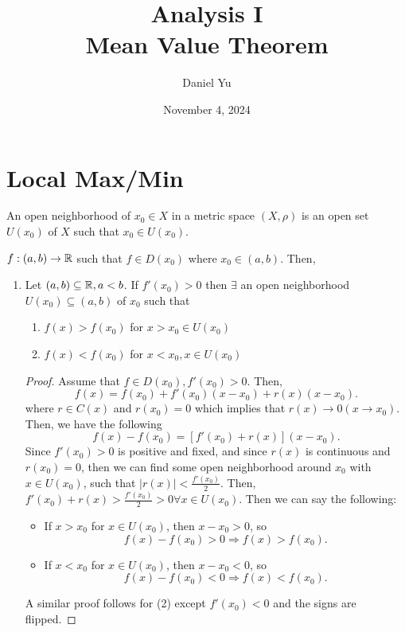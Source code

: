 \documentclass[a4paper]{article}
\title{\Huge{Analysis I}\\ Mean Value Theorem}
\author{\huge{Daniel Yu}}
\date{November 4, 2024}
\begin{document}
\maketitle
\newpage%
\tableofcontents
\pagebreak

\section{Local Max/Min}
\begin{definition}
  An open neighborhood of $x_0 \in X$ in a metric space $(X, \rho)$ is an open set  $U(x_0)$ of $X$ such that  $x_0 \in U(x_0)$. 
\end{definition}

\begin{lemma}
  $f: (a,b) \to \mathbb{R}$ such that $f \in D(x_0)$ where $x_0 \in (a,b)$. Then, 
  \begin{enumerate}
  \item Let $(a,b) \subseteq \mathbb{R}, a < b$. If $f'(x_0) > 0 $ then $\exists $ an open neighborhood $U(x_0) \subseteq (a,b)$ of $x_0$ such that
    \begin{enumerate}
      \item $f(x) > f(x_0)$ for $x > x_0 \in U(x_0)$ 
      \item $f(x) < f(x_0)$ for $x < x_0, x \in U(x_0)$ 
    \end{enumerate}

     \noindent\hrulefill 
    \begin{proof}
      Assume that $f \in D(x_0), f'(x_0) > 0$. Then, 
      \[
        f(x) = f(x_0) + f'(x_0) (x-x_{0}) + r(x) (x-x_0)
      .\] 
      where $r \in C(x)$ and $r(x_0) = 0$ which implies that  $r(x) \to 0 (x \to x_0)$. Then, we have the following 
      \[
        f(x) - f(x_0) = [f'(x_0) + r(x)] (x- x_0)
      .\] 
      Since $f'(x_0) > 0$ is positive and fixed, and since $r(x)$ is continuous and $r(x_0) = 0$, then we can find some open neighborhood around  $x_0$ with $x \in U(x_0)$, such that $\mid r(x) \mid < \frac{f'(x_0)}{2}$. Then,
      $f'(x_0) + r(x) > \frac{f'(x_0)}{2} > 0 \forall x \in U(x_0)$. Then we can say the following:
      \begin{itemize}
        \item If $x > x_0$ for $x \in U(x_0)$, then $x-x_0 > 0$, so
          \[
          f(x) - f(x_0) > 0 \Rightarrow f(x) > f(x_0)
          .\] 
        \item If $x < x_0$ for $x \in U(x_0)$, then $x - x_0 < 0$, so
          \[
          f(x) - f(x_0) < 0 \Rightarrow f(x) < f(x_0)
          .\] 
      \end{itemize}
      A similar proof follows for (2) except $f'(x_0) < 0$ and the signs are flipped.
    \end{proof}


\end{enumerate}
\end{lemma}
\end{document}
